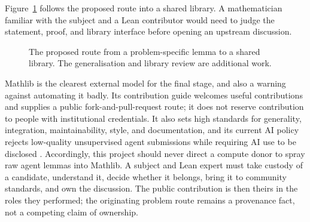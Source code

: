 \documentclass[10pt]{article}
\begin{document}
Figure~\ref{fig:local-to-general} follows the proposed route into a shared
library. A mathematician familiar with the subject and a Lean contributor
would need to judge the statement, proof, and library interface before opening
an upstream discussion.

\begin{figure}[H]
\centering
{}
\caption{The proposed route from a problem-specific lemma to a shared library.
The generalisation and library review are additional work.}
\label{fig:local-to-general}
\end{figure}

Mathlib is the clearest external model for the final stage, and also a warning
against automating it badly.  Its contribution guide welcomes useful
contributions and supplies a public fork-and-pull-request route; it does not
reserve contribution to people with institutional credentials.  It also sets
high standards for generality, integration, maintainability, style, and
documentation, and its current AI policy rejects low-quality unsupervised
agent submissions while requiring AI use to be disclosed \cite{mathlib}.
Accordingly, this project should never direct a compute donor to spray raw
agent lemmas into Mathlib.  A subject and Lean expert must take custody of a
candidate, understand it, decide whether it belongs, bring it to community
standards, and own the discussion.  The public contribution is then theirs in
the roles they performed; the originating problem route remains a provenance
fact, not a competing claim of ownership.
\end{document}
